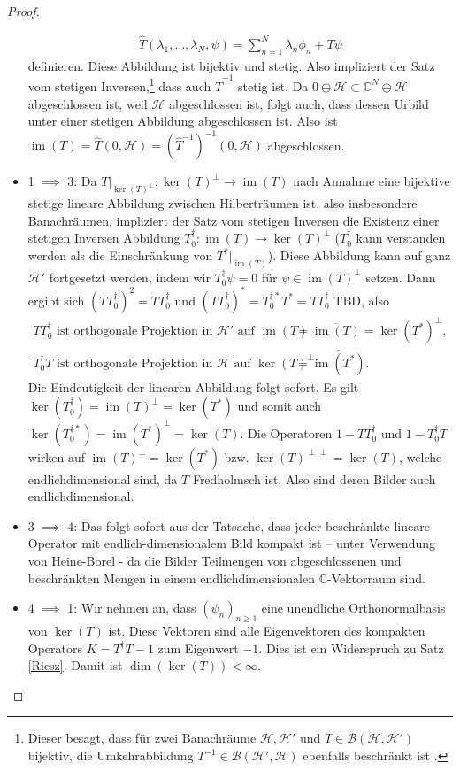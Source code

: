 \documentclass[11pt, hidelinks]{article}
\newcommand{\h}{\mathcal{H}}
\newcommand{\im}{\operatorname{im}}
\numberwithin{conj}{section}
\begin{document}
\begin{proof}
\begin{itemize}
    \begin{align}
        \hat{T}(\lambda_1, \ldots, \lambda_N, \psi) = \sum_{n=1}^{N} \lambda_n \phi_n + T\psi
    \end{align}
    definieren. Diese Abbildung ist bijektiv und stetig. Also impliziert der Satz vom stetigen Inversen,\footnote{Dieser besagt, dass für zwei Banachräume $\h,\h'$ und $T \in \mathcal{B}(\h,\h')$ bijektiv, die Umkehrabbildung $T^{-1} \in \mathcal{B}(\h',\h)$ ebenfalls beschränkt ist \cite[Korollar 3.24]{lechner}.} dass auch $\hat{T}^{-1}$ stetig ist. Da $0 \oplus \h \subset \mathbb{C}^N \oplus \h$ abgeschlossen ist, weil $\h$ abgeschlossen ist, folgt auch, dass dessen Urbild unter einer stetigen Abbildung abgeschlossen ist. Also ist $\im(T) = \hat{T}(0,\h) = (\hat{T}^{-1})^{-1}(0,\h)$ abgeschlossen.
    \item 1 $\implies$ 3: Da $T\vert_{\ker(T)^\perp}: \ker(T)^\perp \to \im(T)$ nach Annahme eine bijektive stetige lineare Abbildung zwischen Hilberträumen ist, also insbesondere Banachräumen, impliziert der Satz vom stetigen Inversen \cite[Korollar 3.24]{lechner} die Existenz einer stetigen Inversen Abbildung $T^\dagger_0: \im(T) \to \ker(T)^\perp$ ($T^\dagger_0$ kann verstanden werden als die Einschränkung von $T^\ast\vert_{\im(T)}$). Diese Abbildung kann auf ganz $\h'$ fortgesetzt werden, indem wir $T^\dagger_0 \psi = 0$ für $\psi \in \im(T)^\perp$ setzen. Dann ergibt sich $(TT^\dagger_0)^2 = TT^\dagger_0$ und $(TT^\dagger_0)^\ast = T^{\dagger\ast}_0 T^\ast =  TT^\dagger_0$ TBD, also
    \begin{align*}
        TT^\dagger_0  \text{ ist orthogonale Projektion in $\h'$ auf } \im(T) &= \overline{\im(T)} = \ker(T^\ast)^\perp, \\
        T^\dagger_0 T \text{ ist orthogonale Projektion in $\h$ auf } \ker(T)^\perp &= \overline{\im(T^\ast)}.
    \end{align*}
    Die Eindeutigkeit der linearen Abbildung folgt sofort. Es gilt $\ker(T_0^\dagger) = \im(T)^\perp = \ker(T^\ast)$ und somit auch $\ker(T_0^{\dagger\ast}) = \im(T^\ast)^\perp = \ker(T)$. Die Operatoren $1-TT^\dagger_0$ und $1-T^\dagger_0 T$ wirken auf $\im(T)^\perp = \ker(T^\ast)$ bzw. $\ker(T)^{\perp\perp} = \ker(T)$, welche endlichdimensional sind, da $T$ Fredholmsch ist. Also sind deren Bilder auch endlichdimensional.
    \item 3 $\implies$ 4: Das folgt sofort aus der Tatsache, dass jeder beschränkte lineare Operator mit endlich-dimensionalem Bild kompakt ist -- unter Verwendung von Heine-Borel - da die Bilder Teilmengen von abgeschlossenen und beschränkten Mengen in einem endlichdimensionalen $\mathbb{C}$-Vektorraum sind.
    \item 4 $\implies$ 1: Wir nehmen an, dass $(\psi_n)_{n \geq 1}$ eine unendliche Orthonormalbasis von $\ker(T)$ ist. Diese Vektoren sind alle Eigenvektoren des kompakten Operators $K = T^\dagger T -1$ zum Eigenwert $-1$. Dies ist ein Widerspruch zu Satz \ref{Riesz}. Damit ist $\dim(\ker(T)) < \infty$.


\end{itemize}
\end{proof}
\end{document}
